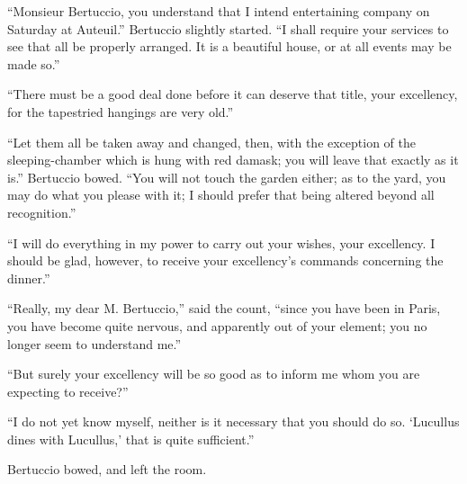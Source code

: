 “Monsieur Bertuccio, you understand that I intend entertaining company
on Saturday at Auteuil.” Bertuccio slightly started. “I shall require
your services to see that all be properly arranged. It is a beautiful
house, or at all events may be made so.”

“There must be a good deal done before it can deserve that title, your
excellency, for the tapestried hangings are very old.”

“Let them all be taken away and changed, then, with the exception of
the sleeping-chamber which is hung with red damask; you will leave that
exactly as it is.” Bertuccio bowed. “You will not touch the garden
either; as to the yard, you may do what you please with it; I should
prefer that being altered beyond all recognition.”

“I will do everything in my power to carry out your wishes, your
excellency. I should be glad, however, to receive your excellency’s
commands concerning the dinner.”

“Really, my dear M. Bertuccio,” said the count, “since you have been in
Paris, you have become quite nervous, and apparently out of your
element; you no longer seem to understand me.”

“But surely your excellency will be so good as to inform me whom you
are expecting to receive?”

“I do not yet know myself, neither is it necessary that you should do
so. ‘Lucullus dines with Lucullus,’ that is quite sufficient.”

Bertuccio bowed, and left the room.

